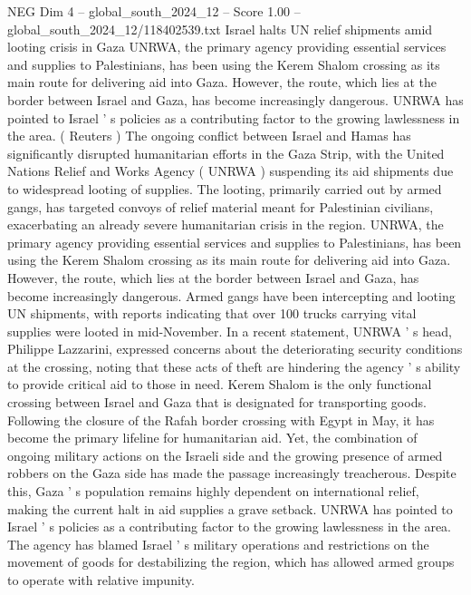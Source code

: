 \begin{textsample}{NEG Dim 4 – global\_south\_2024\_12 – Score 1.00 – global\_south\_2024\_12/118402539.txt}  \label{ex:f4_neg_205}
Israel halts UN relief shipments amid looting crisis in Gaza UNRWA, the primary agency providing essential services and supplies to Palestinians, has been using the Kerem Shalom crossing as its main route for delivering aid into Gaza.
However, the route, which lies at the border between Israel and Gaza, has become increasingly dangerous.
UNRWA has pointed to Israel ' s policies as a contributing factor to the growing lawlessness in the area. ( Reuters ) The ongoing conflict between Israel and Hamas has significantly disrupted humanitarian efforts in the Gaza Strip, with the United Nations Relief and Works Agency ( UNRWA ) suspending its aid shipments due to widespread looting of supplies.
The looting, primarily carried out by armed gangs, has targeted convoys of relief material meant for Palestinian civilians, exacerbating an already severe humanitarian crisis in the region.
UNRWA, the primary agency providing essential services and supplies to Palestinians, has been using the Kerem Shalom crossing as its main route for delivering aid into Gaza.
However, the route, which lies at the border between Israel and Gaza, has become increasingly dangerous.
Armed gangs have been intercepting and looting UN shipments, with reports indicating that over 100 trucks carrying vital supplies were looted in mid-November.
In a recent statement, UNRWA ' s head, Philippe Lazzarini, expressed concerns about the deteriorating security conditions at the crossing, noting that these acts of theft are hindering the agency ' s ability to provide critical aid to those in need.
Kerem Shalom is the only functional crossing between Israel and Gaza that is designated for transporting goods.
Following the closure of the Rafah border crossing with Egypt in May, it has become the primary lifeline for humanitarian aid.
Yet, the combination of ongoing military actions on the Israeli side and the growing presence of armed robbers on the Gaza side has made the passage increasingly treacherous.
Despite this, Gaza ' s population remains highly dependent on international relief, making the current halt in aid supplies a grave setback.
UNRWA has pointed to Israel ' s policies as a contributing factor to the growing lawlessness in the area.
The agency has blamed Israel ' s military operations and restrictions on the movement of goods for destabilizing the region, which has allowed armed groups to operate with relative impunity.

\end{textsample}
